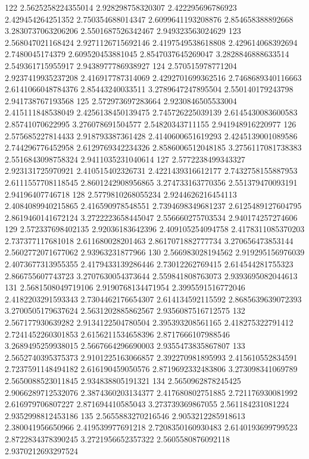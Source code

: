 122 2.5625258224355014 2.928298758320307 2.422295696786923 2.429454264251352 2.750354688014347 2.6099641193208876 2.854658388892668 3.2830737063206206 2.5501687526342467 2.949323563024629
123 2.568047021168424 2.9271126715692146 2.4197549538618808 2.429614068392694 2.7480045174379 2.609520453881045 2.8547037645269047 3.2828846888633514 2.549361715955917 2.9438977786938927
124 2.570515978771204 2.9237419935237208 2.416917787314069 2.4292701699362516 2.7468689340116663 2.6141066048784376 2.85443240033511 3.2789647247895504 2.550140179243798 2.941738767193568
125 2.572973697283664 2.9230846505533004 2.415111848538049 2.4256138450139475 2.745726225039139 2.6145430083600583 2.85741070622995 3.276078691504577 2.54820343711155 2.941948916220977
126 2.575685227814433 2.918793387361428 2.4140600651619293 2.4245139001089586 2.744296776452958 2.6129769342234326 2.8586006512048185 3.2756117081738383 2.5516843098758324 2.9411035231040614
127 2.5772238499343327 2.923131725970921 2.410515402326731 2.4221439316612177 2.7432758155887953 2.6111557708118545 2.8601242908956865 3.274733163770356 2.551379470093191 2.94196407746718
128 2.5779810268055234 2.9244626216454113 2.4084089940215865 2.416590978548551 2.7394698349681237 2.6125489127604795 2.8619460141672124 3.2722223658445047 2.556660275703534 2.940174257274606
129 2.572337698402135 2.92036183642396 2.409105254094758 2.4178311085370203 2.737377117681018 2.611680028201463 2.8617071882777734 3.270656473853144 2.5602772071677062 2.93963231877966
130 2.566983028194562 2.919295156976039 2.4073677313955355 2.4179433139286446 2.73012262769415 2.614544281755323 2.866755607743723 3.2707630054373644 2.559841808763073 2.9393695082044613
131 2.5681508049719106 2.9190768134471954 2.3995591516772046 2.4182203291593343 2.7304462176654307 2.614134592115592 2.8685639639072393 3.2700505179637624 2.5631202885862567 2.9356087516712575
132 2.567177930639282 2.9134122504780504 2.395393208561165 2.418275322791412 2.7241452260301853 2.6156211534658396 2.8717666107988546 3.2689495259938015 2.5667664296690003 2.9355473835867807
133 2.5652740395375373 2.9101225163066857 2.392270981895993 2.415610552834591 2.7237591148494182 2.616190459050576 2.8719692332483806 3.273098341069789 2.5650088523011845 2.934838805191321
134 2.5650962878245425 2.9066289712532076 2.3874360203134377 2.417680802751885 2.721176930081992 2.616979706807227 2.871694410585043 3.273739369867055 2.561184231081224 2.9352998812453186
135 2.5655883270216546 2.9053212285918613 2.380041956650966 2.419539977691218 2.7208350160930483 2.6140193699799523 2.8722834378390245 3.2721956652357322 2.5605580876092118 2.9370212693297524
